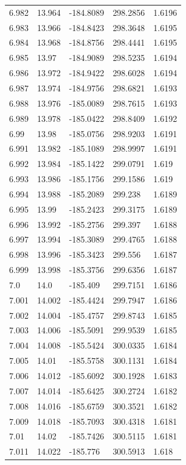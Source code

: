\begin{tabular}{lllll}
6.982 & 13.964 & -184.8089 & 298.2856 & 1.6196 \\
6.983 & 13.966 & -184.8423 & 298.3648 & 1.6195 \\
6.984 & 13.968 & -184.8756 & 298.4441 & 1.6195 \\
6.985 & 13.97 & -184.9089 & 298.5235 & 1.6194 \\
6.986 & 13.972 & -184.9422 & 298.6028 & 1.6194 \\
6.987 & 13.974 & -184.9756 & 298.6821 & 1.6193 \\
6.988 & 13.976 & -185.0089 & 298.7615 & 1.6193 \\
6.989 & 13.978 & -185.0422 & 298.8409 & 1.6192 \\
6.99 & 13.98 & -185.0756 & 298.9203 & 1.6191 \\
6.991 & 13.982 & -185.1089 & 298.9997 & 1.6191 \\
6.992 & 13.984 & -185.1422 & 299.0791 & 1.619 \\
6.993 & 13.986 & -185.1756 & 299.1586 & 1.619 \\
6.994 & 13.988 & -185.2089 & 299.238 & 1.6189 \\
6.995 & 13.99 & -185.2423 & 299.3175 & 1.6189 \\
6.996 & 13.992 & -185.2756 & 299.397 & 1.6188 \\
6.997 & 13.994 & -185.3089 & 299.4765 & 1.6188 \\
6.998 & 13.996 & -185.3423 & 299.556 & 1.6187 \\
6.999 & 13.998 & -185.3756 & 299.6356 & 1.6187 \\
7.0 & 14.0 & -185.409 & 299.7151 & 1.6186 \\
7.001 & 14.002 & -185.4424 & 299.7947 & 1.6186 \\
7.002 & 14.004 & -185.4757 & 299.8743 & 1.6185 \\
7.003 & 14.006 & -185.5091 & 299.9539 & 1.6185 \\
7.004 & 14.008 & -185.5424 & 300.0335 & 1.6184 \\
7.005 & 14.01 & -185.5758 & 300.1131 & 1.6184 \\
7.006 & 14.012 & -185.6092 & 300.1928 & 1.6183 \\
7.007 & 14.014 & -185.6425 & 300.2724 & 1.6182 \\
7.008 & 14.016 & -185.6759 & 300.3521 & 1.6182 \\
7.009 & 14.018 & -185.7093 & 300.4318 & 1.6181 \\
7.01 & 14.02 & -185.7426 & 300.5115 & 1.6181 \\
7.011 & 14.022 & -185.776 & 300.5913 & 1.618 \\

\end{tabular}
